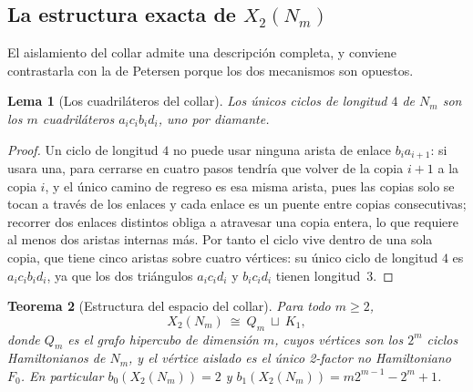 \documentclass[11pt,a4paper]{article}
\newtheorem{teorema}{Teorema}[section]
\newtheorem{lema}[teorema]{Lema}
\theoremstyle{definition}
\theoremstyle{remark}
\begin{document}
\subsection{La estructura exacta de $X_2(N_m)$}\label{sub:estructuraXm}

El aislamiento del collar admite una descripción completa, y conviene contrastarla con la de Petersen porque los dos mecanismos son opuestos.

\begin{lema}[Los cuadriláteros del collar]\label{lem:c4collar}
Los únicos ciclos de longitud $4$ de $N_m$ son los $m$ cuadriláteros $a_ic_ib_id_i$, uno por diamante.
\end{lema}

\begin{proof}
Un ciclo de longitud $4$ no puede usar ninguna arista de enlace $b_ia_{i+1}$: si usara una, para cerrarse en cuatro pasos tendría que volver de la copia $i+1$ a la copia $i$, y el único camino de regreso es esa misma arista, pues las copias solo se tocan a través de los enlaces y cada enlace es un puente entre copias consecutivas; recorrer dos enlaces distintos obliga a atravesar una copia entera, lo que requiere al menos dos aristas internas más. Por tanto el ciclo vive dentro de una sola copia, que tiene cinco aristas sobre cuatro vértices: su único ciclo de longitud $4$ es $a_ic_ib_id_i$, ya que los dos triángulos $a_ic_id_i$ y $b_ic_id_i$ tienen longitud~$3$.
\end{proof}

\begin{teorema}[Estructura del espacio del collar]\label{thm:XQm}
Para todo $m\ge2$,
\[
X_2(N_m)\ \cong\ Q_m\ \sqcup\ K_1 ,
\]
donde $Q_m$ es el grafo hipercubo de dimensión $m$, cuyos vértices son los $2^m$ ciclos Hamiltonianos de $N_m$, y el vértice aislado es el único 2-factor no Hamiltoniano $F_0$. En particular $b_0(X_2(N_m))=2$ y $b_1(X_2(N_m))=m2^{m-1}-2^m+1$.
\end{teorema}
\end{document}
